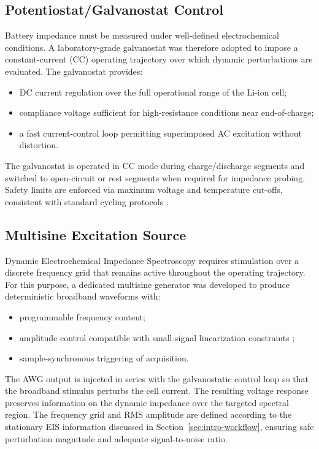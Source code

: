 \subsection{Potentiostat/Galvanostat Control}

Battery impedance must be measured under well-defined electrochemical conditions. A laboratory-grade galvanostat was therefore adopted to impose a constant-current (CC) operating trajectory over which dynamic perturbations are evaluated. The galvanostat provides:
\begin{itemize}
    \item DC current regulation over the full operational range of the Li-ion cell;
    \item compliance voltage sufficient for high-resistance conditions near end-of-charge;
    \item a fast current-control loop permitting superimposed AC excitation without distortion.
\end{itemize}
The galvanostat is operated in CC mode during charge/discharge segments and switched to open-circuit or rest segments when required for impedance probing. Safety limits are enforced via maximum voltage and temperature cut-offs, consistent with standard cycling protocols \cite{}.

\subsection{Multisine Excitation Source}

Dynamic Electrochemical Impedance Spectroscopy requires stimulation over a discrete frequency grid that remains active throughout the operating trajectory. For this purpose, a dedicated multisine generator was developed to produce deterministic broadband waveforms with:
\begin{itemize}
    \item programmable frequency content;
    \item amplitude control compatible with small-signal linearization constraints \cite{};
    \item sample-synchronous triggering of acquisition.
\end{itemize}
The AWG output is injected in series with the galvanostatic control loop so that the broadband stimulus perturbs the cell current. The resulting voltage response preserves information on the dynamic impedance over the targeted spectral region. The frequency grid and RMS amplitude are defined according to the stationary EIS information discussed in Section~\ref{sec:intro-workflow}, ensuring safe perturbation magnitude and adequate signal-to-noise ratio.

